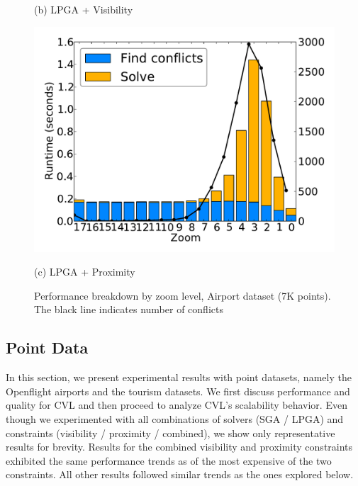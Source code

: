\documentclass[11pt, oneside]{report}
\begin{document}
{\begin{figure}[tb]
\begin{minipage}{0.329\linewidth}
    \centerline{(b) LPGA + Visibility}
  \end{minipage} \hfill
  \begin{minipage}{0.329\linewidth}
    \centerline{\includegraphics[width=0.9\linewidth]{./figs-cvl/prelim_pnt_7k_airports_lp_B.pdf}}
    \centerline{(c) LPGA + Proximity}
  \end{minipage}
  \caption{Performance breakdown by zoom level, Airport dataset (7K points). The black line indicates number of conflicts} \label{fig:performance:airport}
\end{figure}

\subsection{Point Data}
\label{sec:exp:points}

In this section, we present experimental results with point datasets, namely the Openflight airports and the tourism datasets. We first discuss performance and quality for CVL and then proceed to analyze CVL's scalability behavior. Even though we experimented with all combinations of solvers (SGA / LPGA) and constraints (visibility / proximity / combined), we show only representative results for brevity. Results for the combined visibility and proximity constraints exhibited the same performance trends as of the most expensive of the two constraints. All other results followed similar trends as the ones explored below.



}
\end{document}
